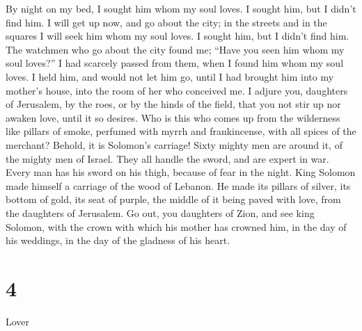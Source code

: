  By night on my bed, I sought him whom my soul loves. I
sought him, but I didn't find him.  I will get up now, and
go about the city; in the streets and in the squares I will seek him
whom my soul loves. I sought him, but I didn't find him. 
The watchmen who go about the city found me; ``Have you seen him whom my
soul loves?''  I had scarcely passed from them, when I found
him whom my soul loves. I held him, and would not let him go, until I
had brought him into my mother's house, into the room of her who
conceived me.  I adjure you, daughters of Jerusalem, by the
roes, or by the hinds of the field, that you not stir up nor awaken
love, until it so desires.  Who is this who comes up from
the wilderness like pillars of smoke, perfumed with myrrh and
frankincense, with all spices of the merchant?  Behold, it
is Solomon's carriage! Sixty mighty men are around it, of the mighty men
of Israel.  They all handle the sword, and are expert in
war. Every man has his sword on his thigh, because of fear in the night.
 King Solomon made himself a carriage of the wood of
Lebanon.  He made its pillars of silver, its bottom of
gold, its seat of purple, the middle of it being paved with love, from
the daughters of Jerusalem.  Go out, you daughters of Zion,
and see king Solomon, with the crown with which his mother has crowned
him, in the day of his weddings, in the day of the gladness of his
heart.

\hypertarget{section-3}{%
\section{4}\label{section-3}}

Lover

